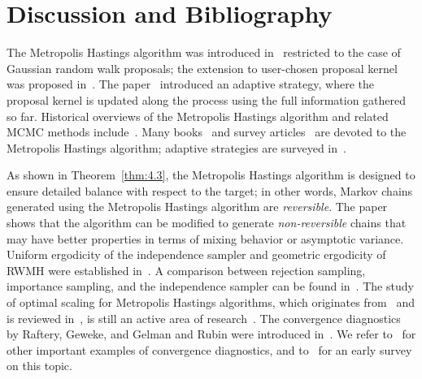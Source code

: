 
\section{Discussion and Bibliography}
\label{sec:4.4}

The Metropolis Hastings algorithm was introduced in~\cite{162} restricted to the case of Gaussian
random walk proposals; the extension to user-chosen proposal kernel was proposed in~\cite{108}.
The paper~\cite{100} introduced an adaptive strategy, where the proposal kernel is updated along
the process using the full information gathered so far. Historical overviews of the Metropolis
Hastings algorithm and related MCMC methods include~\cite{192,61}. Many books~\cite{88,37,193}
and survey articles~\cite{36,225} are devoted to the Metropolis Hastings algorithm; adaptive strategies
are surveyed in~\cite{13,200}.

As shown in Theorem~\ref{thm:4.3}, the Metropolis Hastings algorithm is designed to ensure detailed
balance with respect to the target; in other words, Markov chains generated using the Metropolis
Hastings algorithm are \textit{reversible}. The paper~\cite{26} shows that the algorithm can be modified to
generate \textit{non-reversible} chains that may have better properties in terms of mixing behavior or
asymptotic variance. Uniform ergodicity of the independence sampler and geometric ergodicity
of RWMH were established in~\cite{161}. A comparison between rejection sampling, importance
sampling, and the independence sampler can be found in~\cite{144}. The study of optimal scaling
for Metropolis Hastings algorithms, which originates from~\cite{196,203} and is reviewed in~\cite{198},
is still an active area of research~\cite{240}. The convergence diagnostics by Raftery, Geweke, and
Gelman and Rubin were introduced in~\cite{189,84,81}. We refer to~\cite{167,241,230,229} for other
important examples of convergence diagnostics, and to~\cite{38} for an early survey on this topic.

